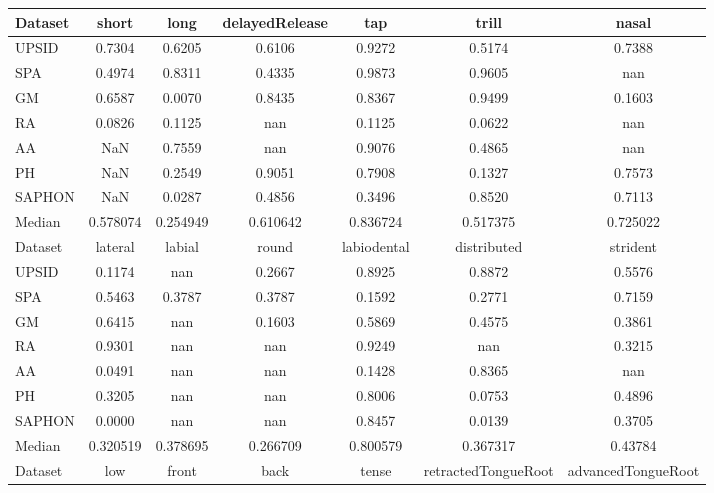 \documentclass[a4paper,12pt]{article}
\begin{document}
\begin{adjustbox}{max width=\textwidth}
\begin{tabular}{ | l | c | c | c | c | c | c |}
    \toprule
    Dataset &     short &      long & delayedRelease &       tap &     trill &     nasal \\
    \midrule
    UPSID &    0.7304 &    0.6205 &         0.6106 &    0.9272 &    0.5174 &    0.7388 \\
    SPA &    0.4974 &    0.8311 &         0.4335 &    0.9873 &    0.9605 &       nan \\
    GM &    0.6587 &    0.0070 &         0.8435 &    0.8367 &    0.9499 &    0.1603 \\
    RA &    0.0826 &    0.1125 &            nan &    0.1125 &    0.0622 &       nan \\
    AA &       NaN &    0.7559 &            nan &    0.9076 &    0.4865 &       nan \\
    PH &       NaN &    0.2549 &         0.9051 &    0.7908 &    0.1327 &    0.7573 \\
    SAPHON &       NaN &    0.0287 &         0.4856 &    0.3496 &    0.8520 &    0.7113 \\
    Median &  0.578074 &  0.254949 &       0.610642 &  0.836724 &  0.517375 &  0.725022 \\
    \bottomrule
    \toprule
    Dataset &   lateral &    labial &     round & labiodental & distributed & strident \\
    \midrule
    UPSID &    0.1174 &       nan &    0.2667 &      0.8925 &      0.8872 &   0.5576 \\
    SPA &    0.5463 &    0.3787 &    0.3787 &      0.1592 &      0.2771 &   0.7159 \\
    GM &    0.6415 &       nan &    0.1603 &      0.5869 &      0.4575 &   0.3861 \\
    RA &    0.9301 &       nan &       nan &      0.9249 &         nan &   0.3215 \\
    AA &    0.0491 &       nan &       nan &      0.1428 &      0.8365 &      nan \\
    PH &    0.3205 &       nan &       nan &      0.8006 &      0.0753 &   0.4896 \\
    SAPHON &    0.0000 &       nan &       nan &      0.8457 &      0.0139 &   0.3705 \\
    Median &  0.320519 &  0.378695 &  0.266709 &    0.800579 &    0.367317 &  0.43784 \\
    \bottomrule
    \toprule
    Dataset &       low &     front &      back &     tense & retractedTongueRoot & advancedTongueRoot \\

\end{tabular}
\end{adjustbox}
\end{document}
